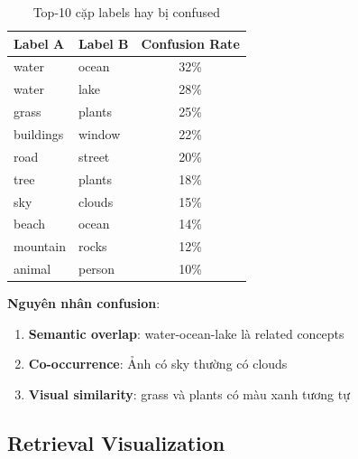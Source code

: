 \documentclass[12pt,a4paper]{article}
\begin{document}
\begin{table}[H]
\centering
\caption{Top-10 cặp labels hay bị confused}
\begin{tabular}{ll|c}
\toprule
\textbf{Label A} & \textbf{Label B} & \textbf{Confusion Rate} \\
\midrule
water & ocean & 32\% \\
water & lake & 28\% \\
grass & plants & 25\% \\
buildings & window & 22\% \\
road & street & 20\% \\
tree & plants & 18\% \\
sky & clouds & 15\% \\
beach & ocean & 14\% \\
mountain & rocks & 12\% \\
animal & person & 10\% \\
\bottomrule
\end{tabular}
\end{table}

\textbf{Nguyên nhân confusion}:
\begin{enumerate}
    \item \textbf{Semantic overlap}: water-ocean-lake là related concepts
    \item \textbf{Co-occurrence}: Ảnh có sky thường có clouds
    \item \textbf{Visual similarity}: grass và plants có màu xanh tương tự
\end{enumerate}

\subsection{Retrieval Visualization}
\end{document}
